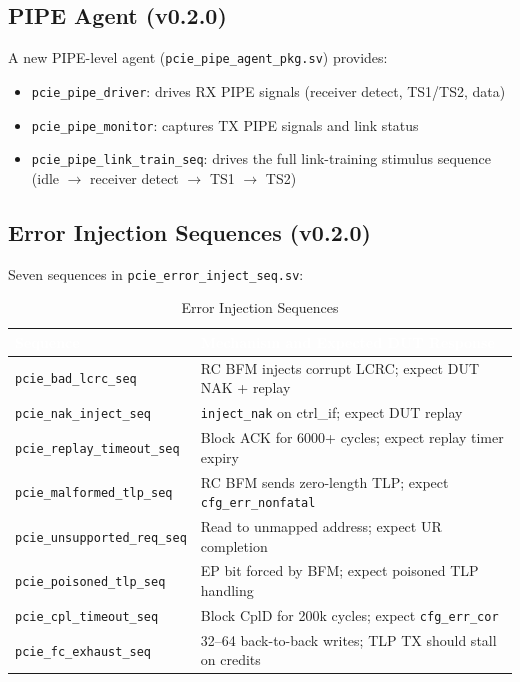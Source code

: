 \documentclass[12pt,a4paper]{report}
\newcommand{\theadcell}[1]{%
  \cellcolor{tablehead}\textcolor{white}{\textbf{#1}}}
\begin{document}
\subsection{PIPE Agent (v0.2.0)}

A new PIPE-level agent (\texttt{pcie\_pipe\_agent\_pkg.sv}) provides:
\begin{itemize}[noitemsep]
  \item \texttt{pcie\_pipe\_driver}: drives RX PIPE signals (receiver detect,
    TS1/TS2, data)
  \item \texttt{pcie\_pipe\_monitor}: captures TX PIPE signals and link status
  \item \texttt{pcie\_pipe\_link\_train\_seq}: drives the full link-training
    stimulus sequence (idle $\to$ receiver detect $\to$ TS1 $\to$ TS2)
\end{itemize}

\subsection{Error Injection Sequences (v0.2.0)}

Seven sequences in \texttt{pcie\_error\_inject\_seq.sv}:

\begin{table}[H]
\centering
\caption{Error Injection Sequences}
\label{tab:errinj}
\begin{tabular}{lp{9cm}}
  \toprule
  \theadcell{Sequence} & \theadcell{Mechanism and Expected DUT Response} \\
  \midrule
  \texttt{pcie\_bad\_lcrc\_seq}       & RC BFM injects corrupt LCRC; expect DUT NAK + replay \\
  \texttt{pcie\_nak\_inject\_seq}     & \texttt{inject\_nak} on ctrl\_if; expect DUT replay \\
  \texttt{pcie\_replay\_timeout\_seq} & Block ACK for 6000+ cycles; expect replay timer expiry \\
  \texttt{pcie\_malformed\_tlp\_seq}  & RC BFM sends zero-length TLP; expect \texttt{cfg\_err\_nonfatal} \\
  \texttt{pcie\_unsupported\_req\_seq}& Read to unmapped address; expect UR completion \\
  \texttt{pcie\_poisoned\_tlp\_seq}   & EP bit forced by BFM; expect poisoned TLP handling \\
  \texttt{pcie\_cpl\_timeout\_seq}    & Block CplD for 200k cycles; expect \texttt{cfg\_err\_cor} \\
  \texttt{pcie\_fc\_exhaust\_seq}     & 32--64 back-to-back writes; TLP TX should stall on credits \\
  \bottomrule
\end{tabular}
\end{table}
\end{document}
